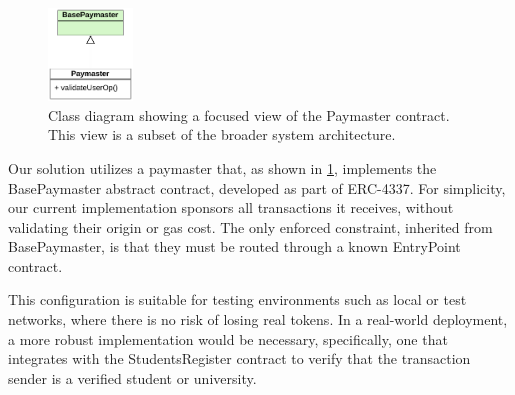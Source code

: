 \begin{figure}
  \centering
  \includegraphics[width=0.2\textwidth]{figures/Paymaster class diagram.pdf}
  \caption[Class diagram focused on Paymaster contract]{Class diagram showing a focused view of the Paymaster contract. This view is a subset of the broader system architecture.}
  \label{fig:paymasterContractClass}
\end{figure}
Our solution utilizes a paymaster that, as shown in \cref{fig:paymasterContractClass}, implements the BasePaymaster abstract contract, developed as part of ERC-4337. For simplicity, our current implementation sponsors all transactions it receives, without validating their origin or gas cost. The only enforced constraint, inherited from BasePaymaster, is that they must be routed through a known EntryPoint contract.

This configuration is suitable for testing environments such as local or test networks, where there is no risk of losing real tokens. In a real-world deployment, a more robust implementation would be necessary, specifically, one that integrates with the StudentsRegister contract to verify that the transaction sender is a verified student or university. 